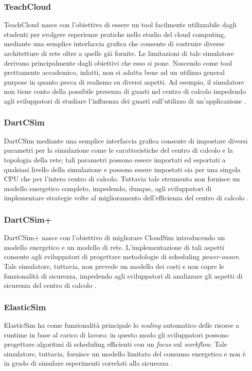 {\subsubsection*{TeachCloud}
TeachCloud \cite{jararweh2013teachcloud} nasce con l'obiettivo di essere un tool facilmente utilizzabile dagli studenti per svolgere esperienze pratiche nello studio del cloud computing, mediante una semplice interfaccia grafica che consente di costruire diverse architetture di rete oltre a quelle già fornite. Le limitazioni di tale simulatore derivano principalmente dagli obiettivi che esso si pone. Nascendo come tool prettamente accademico, infatti, non si adatta bene ad un utilizzo general purpose in quanto pecca di realismo su diversi aspetti. Ad esempio, il simulatore non tiene conto della possibile presenza di guasti nel centro di calcolo impedendo agli sviluppatori di studiare l'influenza dei guasti sull'utilizzo di un'applicazione \cite{mansouri2020cloud}. 
\subsubsection*{DartCSim}
DartCSim \cite{li2012dartcsim} mediante una semplice interfaccia grafica consente di impostare diversi parametri per la simulazione come le caratteristiche del centro di calcolo e la topologia della rete; tali parametri possono essere importati ed esportati a qualsiasi livello della simulazione e possono essere impostati sia per una singola CPU che per l'intero centro di calcolo. Tuttavia tale strumento non fornisce un modello energetico completo, impedendo, dunque, agli sviluppatori di implementare strategie volte al miglioramento dell'efficienza del centro di calcolo \cite{mansouri2020cloud}. 
\subsubsection*{DartCSim+}
DartCSim+ \cite{dartcsim+} nasce con l'obiettivo di migliorare CloudSim introducendo un modello energetico e un modello di rete. L'implementazione di tali aspetti consente agli sviluppatori di progettare metodologie di scheduling \emph{power-aware}. Tale simulatore, tuttavia, non prevede un modello dei costi e non copre le funzionalità di sicurezza, impedendo agli sviluppatori di analizzare gli aspetti di sicurezza del centro di calcolo \cite{mansouri2020cloud}. 
\subsubsection*{ElasticSim}
ElasticSim \cite{cai2017elasticsim} ha come funzionalità principale lo \emph{scaling} automatico delle risorse a runtime in base al carico di lavoro: in questo modo gli sviluppatori possono progettare algoritmi di scheduling efficienti con un \emph{focus} sul \emph{workflow}. Tale simulatore, tuttavia, fornisce un modello limitato del consumo energetico e non è in grado di simulare esperimenti correlati alla sicurezza \cite{mansouri2020cloud}. 
}
